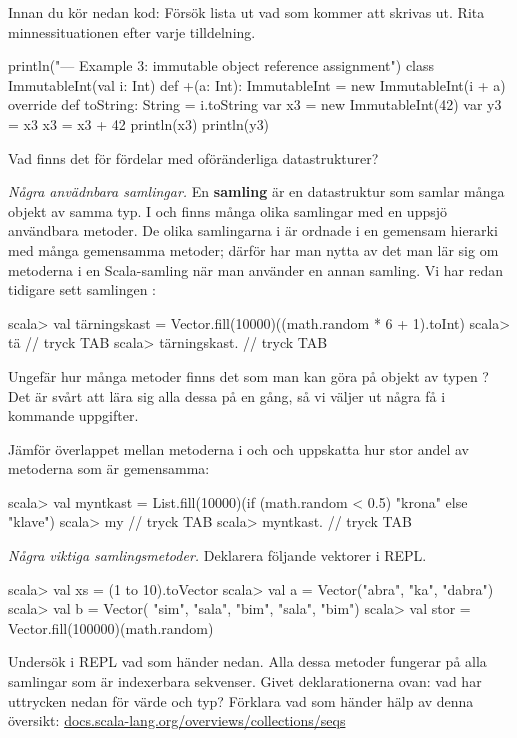 \Subtask\Pen Innan du kör nedan kod: Försök lista ut vad som kommer att skrivas ut. Rita minnessituationen efter varje tilldelning.

\begin{Code}
println("\n--- Example 3: immutable object reference assignment")
class ImmutableInt(val i: Int) {
  def +(a: Int): ImmutableInt = new ImmutableInt(i + a) 
  override def toString: String = i.toString
}
var x3 = new ImmutableInt(42)
var y3 = x3
x3 = x3 + 42
println(x3)
println(y3)
\end{Code}

\Subtask\Pen Vad finns det för fördelar med oföränderliga datastrukturer?


\Task \emph{Några anvädnbara samlingar.} En \textbf{samling}  är en datastruktur som samlar många objekt av samma typ. I  och  finns många olika samlingar med en uppsjö användbara metoder. De olika samlingarna i  är ordnade i en gemensam hierarki med många gemensamma metoder; därför har man nytta av det man lär sig om metoderna i en Scala-samling när man använder en annan samling. Vi har redan tidigare sett samlingen :

\begin{REPL}
scala> val tärningskast = Vector.fill(10000)((math.random * 6 + 1).toInt)
scala> tä   // tryck TAB
scala> tärningskast.  // tryck TAB
\end{REPL}

\Subtask Ungefär hur många metoder finns det som man kan göra på objekt av typen ? Det är svårt att lära sig alla dessa på en gång, så vi väljer ut några få i kommande uppgifter.

\Subtask Jämför överlappet mellan metoderna i  och  och uppskatta hur stor andel av metoderna som är gemensamma: 
\begin{REPL}
scala> val myntkast = 
         List.fill(10000)(if (math.random < 0.5) "krona" else "klave")
scala> my   // tryck TAB
scala> myntkast.  // tryck TAB
\end{REPL}

\Task \emph{Några viktiga samlingsmetoder.} Deklarera följande vektorer i REPL. 
\begin{REPL}
scala> val xs = (1 to 10).toVector
scala> val a = Vector("abra", "ka", "dabra")
scala> val b = Vector( "sim", "sala", "bim", "sala", "bim")
scala> val stor = Vector.fill(100000)(math.random)
\end{REPL}
Undersök i REPL vad som händer nedan. Alla dessa metoder fungerar på alla samlingar som är indexerbara sekvenser. Givet deklarationerna ovan: vad har uttrycken nedan för värde och typ? Förklara vad som händer hälp av denna  översikt: \href{http://docs.scala-lang.org/overviews/collections/seqs}{docs.scala-lang.org/overviews/collections/seqs}


